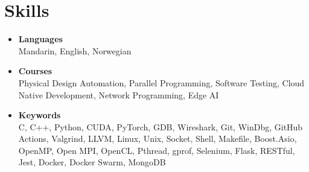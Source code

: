 \documentclass[letterpaper,11pt]{article}
\newcommand{\resumeItem}[2]{
  \item\small{
    \textbf{#1}{\\ #2 \vspace{-2pt}}
  }
}
\newcommand{\resumeSubItem}[2]{\resumeItem{#1}{#2}\vspace{-4pt}}
\newcommand{\resumeSubHeadingListStart}{\begin{itemize}[leftmargin=*]}
\newcommand{\resumeSubHeadingListEnd}{\end{itemize}}
\begin{document}
\section{Skills}
  \resumeSubHeadingListStart
  \resumeSubItem{Languages}
    {Mandarin, English, Norwegian}
  \resumeSubItem{Courses}
    {
      Physical Design Automation, Parallel Programming, Software Testing, Cloud Native Development, Network Programming,
      Edge AI
    }
  \resumeSubItem{Keywords}
    {C, C++, Python, CUDA, PyTorch, GDB, Wireshark, Git, WinDbg, GitHub Actions, Valgrind, LLVM,
     Linux, Unix, Socket, Shell, Makefile, Boost.Asio, OpenMP, Open MPI, OpenCL, Pthread, gprof, Selenium,
     Flask, RESTful, Jest, Docker, Docker Swarm, MongoDB}
  \resumeSubHeadingListEnd

\end{document}
